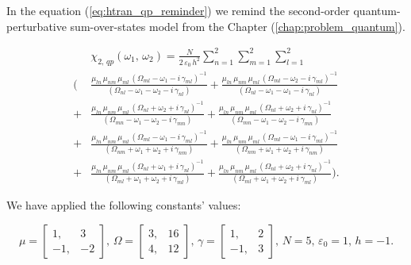 \documentclass[12pt,twoside,a4paper]{article}
\numberwithin{equation}{subsection}
\numberwithin{figure}{subsection}
\begin{document}
In the equation (\ref{eq:htran_qp_reminder}) we remind the second-order quantum-perturbative sum-over-states model from the Chapter
(\ref{chap:problem_quantum}). 

\begin{equation} \label{eq:htran_qp_reminder}
  \begin{split} 
     & \chi_{2, \, qp}(\omega_1, \, \omega_2 ) = 
    \frac{N} {2 \, \varepsilon_0 \, h^2} \sum_{n=1}^{2} \sum_{m=1}^{2} \sum_{l=1}^{2} 
    \\ ( & \frac {{\mu_{ln}} \, {\mu_{nm}} \, {\mu_{ml}} \, ({\Omega_{ml}} - \omega_1 - i \, {\gamma_{ml}})^{-1} }
        {({\Omega_{nl}} - \omega_1 - \omega_2 - i \, {\gamma_{nl}}) }
       + \frac {{\mu_{ln}} \, {\mu_{nm}} \, {\mu_{ml}} \, ({\Omega_{ml}} - \omega_2 - i \, {\gamma_{ml}})^{-1} }
        {({\Omega_{nl}} - \omega_1 - \omega_1 - i \, {\gamma_{nl}}) } 
    \\ + & \frac {{\mu_{ln}} \, {\mu_{nm}} \, {\mu_{ml}} \, ({\Omega_{nl}} + \omega_2 + i \, {\gamma_{nl}})^{-1} }
        {({\Omega_{mn}} - \omega_1 - \omega_2 - i \, {\gamma_{mn}}) } 
       + \frac {{\mu_{ln}} \, {\mu_{nm}} \, {\mu_{ml}} \, ({\Omega_{nl}} + \omega_2 + i \, {\gamma_{nl}})^{-1} }
        {({\Omega_{mn}} - \omega_1 - \omega_2 - i \, {\gamma_{mn}}) } 
    \\ + & \frac {{\mu_{ln}} \, {\mu_{nm}} \, {\mu_{ml}} \, ({\Omega_{ml}} - \omega_1 - i \, {\gamma_{ml}})^{-1} }
        {({\Omega_{nm}} + \omega_1 + \omega_2 + i \, {\gamma_{nm}}) } 
       + \frac {{\mu_{ln}} \, {\mu_{nm}} \, {\mu_{ml}} \, ({\Omega_{ml}} - \omega_1 - i \, {\gamma_{ml}})^{-1} }
        {({\Omega_{nm}} + \omega_1 + \omega_2 + i \, {\gamma_{nm}}) } 
    \\ + & \frac {{\mu_{ln}} \, {\mu_{nm}} \, {\mu_{ml}} \, ({\Omega_{nl}} + \omega_1 + i \, {\gamma_{nl}})^{-1} }
        {({\Omega_{ml}} + \omega_1 + \omega_2 + i \, {\gamma_{ml}}) } 
       + \frac {{\mu_{ln}} \, {\mu_{nm}} \, {\mu_{ml}} \, ({\Omega_{nl}} + \omega_2 + i \, {\gamma_{nl}})^{-1} }
        {({\Omega_{ml}} + \omega_1 + \omega_2 + i \, {\gamma_{ml}})}).
  \end{split} 
\end{equation}

We have applied the following constants' values: 

\begin{equation} \label{eq:htran_qp_constant}
  \mu = \begin{bmatrix}
          1, &  3 \\
         -1, & -2
        \end{bmatrix}, \,
  \Omega = \begin{bmatrix}
          3, & 16 \\
          4, & 12
        \end{bmatrix}, \,
  \gamma = \begin{bmatrix}
          1, & 2 \\
         -1, & 3
        \end{bmatrix}, \,
  N = 5, \,
  \varepsilon_0 = 1, \, 
  h = -1.
\end{equation}
\end{document}

